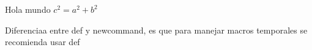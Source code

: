 \documentclass{book}
\newcommand\chapterfile[1]{
  \def\namefile{#1}
  \sectiontheory{#1}
  \sectionform{#1}
}
\newcommand\sectiontheory[1]{
  \def\rootimage{#1/IMAGES-TEORIA-#1}
  
}
\def\holamundo{$c^2 = a^2 + b^2$}
\newcommand\sectionform[1]{
  \def\rootimage{#1/IMAGES-FORMULARIO-#1}
  
}
\begin{document}
  Hola mundo
  \holamundo

  Diferenciaa entre def y newcommand, es que para manejar macros temporales se recomienda usar def\\

  \chapterfile{VECTORES}
\end{document}
